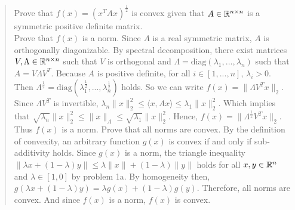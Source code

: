 \begin{quote}
    Prove that $f(x) = (x^T Ax)^{\frac{1}{2}}$ is convex given that $A \in \mathbb{R}^{n \times n}$ is a symmetric positive definite matrix.\\

Prove that $f(x)$ is a norm.
Since $A$ is a real symmetric matrix, $A$ is orthogonally diagonizable.
By spectral decomposition, there exist matrices $V, \Lambda \in \mathbb{R}^{n \times n}$ such that $V$ is orthogonal and $\Lambda = \textrm{diag}(\lambda_1, ..., \lambda_n)$ such that $A = V \Lambda V^T$. 
Because $A$ is positive definite, for all $i \in [1, ..., n]$, $\lambda_i > 0$.
Then $\Lambda^{\frac{1}{2}} = \textrm{diag}(\lambda_1^{\frac{1}{2}}, ..., \lambda_n^{\frac{1}{2}})$ holds.
So we can write $f(x) = \| \Lambda V^T x \|_2$.
Since $\Lambda V^T$ is invertible, $\lambda_n \|x \|_2^2 \leq \langle x, Ax \rangle \leq \lambda_1 \|x \|_2^2$.
Which implies that $\sqrt{\lambda_n} \|x \|_2^2 \leq \|x \|_A \leq \sqrt{\lambda_1} \|x \|_2^2$.
Hence, $f(x) = \| \Lambda^{\frac{1}{2}} V^T x \|_2$. 
Thus $f(x)$ is a norm.
Prove that all norms are convex.
By the definition of convexity, an arbitrary function $g(x)$ is convex if and only if sub-additivity holds. 
Since $g(x)$ is a norm, the triangle inequality $\| \lambda x + (1 - \lambda)y \| \leq \lambda \|x \| + (1 - \lambda) \|y \|$ holds for all $x, y \in \mathbb{R}^n$ and $\lambda \in [1, 0]$ by problem 1a.
By homogeneity then, $g(\lambda x +  (1 - \lambda) y) = \lambda g(x) + (1 - \lambda)g(y)$.
Therefore, all norms are convex.
And since $f(x)$ is a norm, $f(x)$ is convex. \\
\end{quote}

